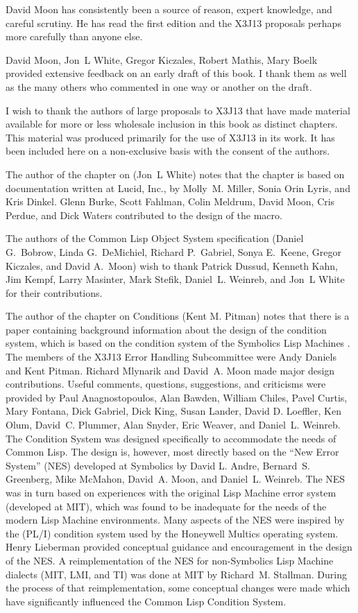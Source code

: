 David Moon has consistently been a source of reason,
expert knowledge, and careful scrutiny.  He has read the
first edition and the X3J13 proposals perhaps more carefully
than anyone else.

David Moon, Jon~L White, Gregor Kiczales, Robert Mathis, Mary Boelk
provided extensive feedback on an early draft of this book.
I thank them as well as the many others who commented in one way
or another on the draft.

I wish to thank the authors of large proposals to X3J13
that have made material available for more or less wholesale
inclusion in this book as distinct chapters.
This material was produced primarily for the use of X3J13 in its work.
It has been included here
on a non-exclusive basis with the consent of the authors.

The author of the chapter on  (Jon~L White)
notes that the chapter is based on documentation
written at Lucid, Inc., by Molly~M. Miller,
Sonia Orin Lyris, and Kris Dinkel.
Glenn Burke, Scott Fahlman, Colin Meldrum,
David Moon, Cris Perdue, and Dick Waters
contributed to the design of the  macro.

The authors of the Common Lisp Object System specification
(Daniel G.~Bobrow, Linda G.~DeMichiel,
Richard P.~Gabriel, Sonya E.~Keene, Gregor Kiczales,
and David A.~Moon)
wish to thank Patrick Dussud, Kenneth Kahn,
Jim Kempf, Larry Masinter, Mark Stefik,
Daniel~L. Weinreb, and Jon~L White
for their contributions.

The author of the chapter on Conditions (Kent M. Pitman)
notes that there is a paper \cite{EXCEPTIONAL-SITUATIONS}
containing background information about the design of the
condition system, which is based on the condition system
of the Symbolics Lisp Machines \cite{SIGNALLING-CONDITIONS}.
The members of the X3J13 Error Handling Subcommittee
were
Andy Daniels and Kent Pitman.
Richard Mlynarik and David~A. Moon made major design contributions.
Useful comments, questions,
suggestions, and criticisms were provided by
    Paul Anagnostopoulos,
    Alan Bawden,
    William Chiles,
    Pavel Curtis,
    Mary Fontana,
    Dick Gabriel,
    Dick King,
    Susan Lander,
   David D. Loeffler,
 Ken Olum,
 David~C. Plummer,
 Alan Snyder,
   Eric Weaver, and
Daniel~L. Weinreb.
The Condition System was designed specifically to
accommodate the needs of Common Lisp.
The design is, however, most directly based on the ``New Error System''
(NES) developed at Symbolics by    David L. Andre,
    Bernard~S. Greenberg,
    Mike McMahon,
    David~A. Moon, and
    Daniel~L. Weinreb.
The NES was in turn based on experiences with the original Lisp
Machine error system (developed at MIT), which was found to be
inadequate for the needs of the modern Lisp Machine environments.
Many aspects of the NES were inspired by the (PL/I) condition
system used by the Honeywell Multics operating system. Henry Lieberman
provided
conceptual guidance and encouragement in the design of the NES.
A reimplementation of the NES for non-Symbolics Lisp Machine 
dialects (MIT, LMI, and TI) was done at MIT by Richard~M. Stallman.
During the process
of that reimplementation, some conceptual changes were made which
have significantly influenced the Common Lisp Condition System.

